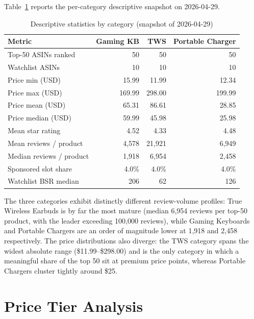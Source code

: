 Table~\ref{tab:data_summary} reports the per-category descriptive snapshot
on 2026-04-29.

\begin{table}[H]
  \centering
  \begin{tabular}{lrrr}
    \toprule
    \textbf{Metric} & \textbf{Gaming KB} & \textbf{TWS} & \textbf{Portable Charger} \\
    \midrule
    Top-50 ASINs ranked       & 50      & 50      & 50      \\
    Watchlist ASINs           & 10      & 10      & 10      \\
    Price min (USD)           & 15.99   & 11.99   & 12.34   \\
    Price max (USD)           & 169.99  & 298.00  & 199.99  \\
    Price mean (USD)          & 65.31   & 86.61   & 28.85   \\
    Price median (USD)        & 59.99   & 45.98   & 25.98   \\
    Mean star rating          & 4.52    & 4.33    & 4.48    \\
    Mean reviews / product    & 4{,}578 & 21{,}921& 6{,}949 \\
    Median reviews / product  & 1{,}918 & 6{,}954 & 2{,}458 \\
    Sponsored slot share      & 4.0\%   & 4.0\%   & 4.0\%   \\
    Watchlist BSR median      & 206     & 62      & 126     \\
    \bottomrule
  \end{tabular}
  \caption{Descriptive statistics by category (snapshot of 2026-04-29)}
  \label{tab:data_summary}
\end{table}

The three categories exhibit distinctly different review-volume profiles:
True Wireless Earbuds is by far the most mature (median 6{,}954 reviews per
top-50 product, with the leader exceeding 100{,}000 reviews), while Gaming
Keyboards and Portable Chargers are an order of magnitude lower at 1{,}918
and 2{,}458 respectively. The price distributions also diverge: the TWS
category spans the widest absolute range (\$11.99--\$298.00) and is the only
category in which a meaningful share of the top 50 sit at premium price
points, whereas Portable Chargers cluster tightly around \$25.

\section{Price Tier Analysis}

